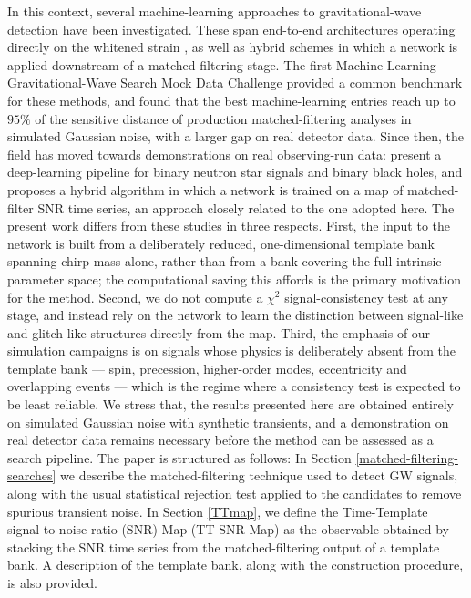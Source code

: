 \documentclass[aps,prd,twocolumn,superscriptaddress,nofootinbib, longbibliography]{revtex4-2}
\begin{document}
	In this context, several machine-learning approaches to gravitational-wave detection have been investigated. These span end-to-end architectures operating directly on the whitened strain \cite{ml_pipeline2024, deepresnet2022, cnn_unmodelled2024}, as well as hybrid schemes in which a network is applied downstream of a matched-filtering stage. The first Machine Learning Gravitational-Wave Search Mock Data Challenge \cite{mlgwsc1_mock} provided a common benchmark for these methods, and found that the best machine-learning entries reach up to $95\%$ of the sensitive distance of production matched-filtering analyses in simulated Gaussian noise, with a larger gap on real detector data. Since then, the field has moved towards demonstrations on real observing-run data: \cite{bns_dl_pipeline2024, 3yph-35r4} present a deep-learning pipeline for binary neutron star signals and binary black holes, and \cite{arXiv:2512.12399} proposes a hybrid algorithm in which a network is trained on a map of matched-filter SNR time series, an approach closely related to the one adopted here. The present work differs from these studies in three respects. First, the input to the network is built from a deliberately reduced, one-dimensional template bank spanning chirp mass alone, rather than from a bank covering the full intrinsic parameter space; the computational saving this affords is the primary motivation for the method. Second, we do not compute a $\chi^2$ signal-consistency test at any stage, and instead rely on the network to learn the distinction between signal-like and glitch-like structures directly from the map. Third, the emphasis of our simulation campaigns is on signals whose physics is deliberately absent from the template bank --- spin, precession, higher-order modes, eccentricity and overlapping events --- which is the regime where a consistency test is expected to be least reliable. We stress that, the results presented here are obtained entirely on simulated Gaussian noise with synthetic transients, and a demonstration on real detector data remains necessary before the method can be assessed as a search pipeline. The paper is structured as follows:
	In Section \ref{matched-filtering-searches} we describe the matched-filtering technique used to detect GW signals, along with the usual statistical rejection test applied to the candidates to remove spurious transient noise.
	In Section \ref{TTmap}, we define the Time-Template signal-to-noise-ratio (SNR) Map (TT-SNR Map) as the observable obtained by stacking the SNR time series from the matched-filtering output of a template bank. A description of the template bank, along with the construction procedure, is also provided. 	
\end{document}
